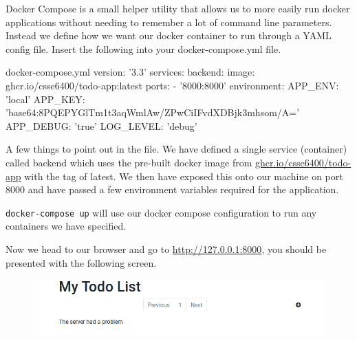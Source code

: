 \documentclass{csse4400}
\begin{document}
Docker Compose is a small helper utility that allows us to more easily run docker applications without needing to remember a lot of command line parameters.
Instead we define how we want our docker container to run through a YAML config file.
Insert the following into your docker-compose.yml file.

\begin{code}[language=docker-compose]{docker-compose.yml}
version: '3.3'
services:
  backend:
    image: ghcr.io/csse6400/todo-app:latest
    ports:
      - '8000:8000'
    environment:
      APP_ENV: 'local'
      APP_KEY: 'base64:8PQEPYGlTm1t3aqWmlAw/ZPwCiIFvdXDBjk3mhsom/A='
      APP_DEBUG: 'true'
      LOG_LEVEL: 'debug'
\end{code}


A few things to point out in the file.
We have defined a single service (container) called backend which uses the pre-built docker image from \url{ghcr.io/csse6400/todo-app} with the tag of latest.
We then have exposed this onto our machine on port 8000 and have passed a few environment variables required for the application.%

\lstinline{docker-compose up} will use our docker compose configuration to run any containers we have specified.


Now we head to our browser and go to \url{http://127.0.0.1:8000},
you should be presented with the following screen.

\begin{figure}[ht]
\includegraphics[width=\textwidth]{images/app-missing-db}
\end{figure}
\end{document}
